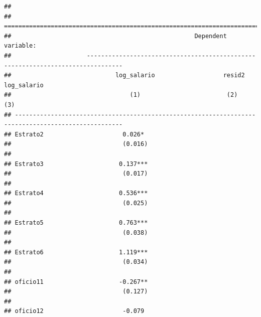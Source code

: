 \documentclass[
]{article}
\begin{document}
\begin{verbatim}
## 
## ====================================================================================================
##                                                   Dependent variable:                               
##                     --------------------------------------------------------------------------------
##                             log_salario                   resid2                  log_salario       
##                                 (1)                        (2)                        (3)           
## ----------------------------------------------------------------------------------------------------
## Estrato2                      0.026*                                                                
##                               (0.016)                                                               
##                                                                                                     
## Estrato3                     0.137***                                                               
##                               (0.017)                                                               
##                                                                                                     
## Estrato4                     0.536***                                                               
##                               (0.025)                                                               
##                                                                                                     
## Estrato5                     0.763***                                                               
##                               (0.038)                                                               
##                                                                                                     
## Estrato6                     1.119***                                                               
##                               (0.034)                                                               
##                                                                                                     
## oficio11                     -0.267**                                                               
##                               (0.127)                                                               
##                                                                                                     
## oficio12                      -0.079                                                                

\end{verbatim}
\end{document}
